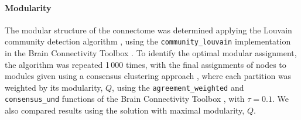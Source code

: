 \documentclass[10pt,letterpaper]{article}
\begin{document}
\paragraph{Modularity}
The modular structure of the connectome was determined applying the Louvain community detection algorithm \cite{Blondel:2008do}, using the \texttt{community\_louvain} implementation in the Brain Connectivity Toolbox \cite{Rubinov2010}.
To identify the optimal modular assignment, the algorithm was repeated 1\,000 times, with the final assignments of nodes to modules given using a consensus clustering approach \cite{Lancichinetti2012}, where each partition was weighted by its modularity, $Q$, using the \texttt{agreement\_weighted} and \texttt{consensus\_und} functions of the Brain Connectivity Toolbox \cite{Rubinov2010}, with $\tau = 0.1$.
We also compared results using the solution with maximal modularity, $Q$.



\end{document}
